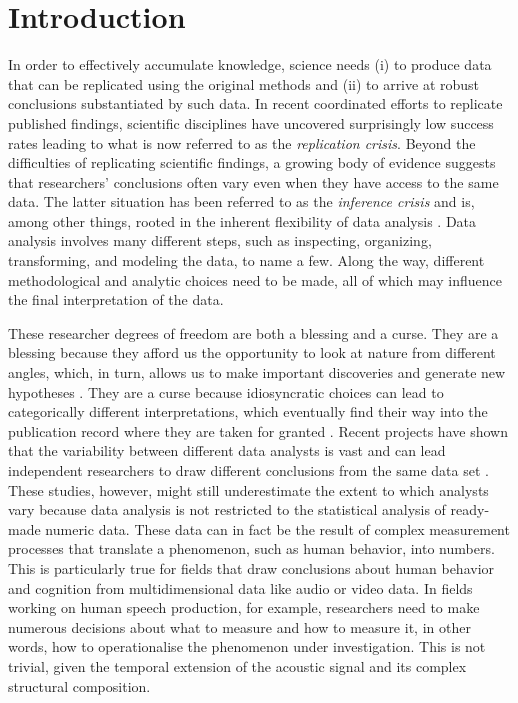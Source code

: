 \documentclass[Review,times,sageh]{sagej}
\begin{document}
\hypertarget{introduction}{%
\section{Introduction}\label{introduction}}

In order to effectively accumulate knowledge, science needs (i) to produce data that can be replicated using the original methods and (ii) to arrive at robust conclusions substantiated by such data.
In recent coordinated efforts to replicate published findings, scientific disciplines have uncovered surprisingly low success rates \citep[e.g.,][]{open2015estimating, camerer2018evaluating} leading to what is now referred to as the \emph{replication crisis}.
Beyond the difficulties of replicating scientific findings, a growing body of evidence suggests that researchers' conclusions often vary even when they have access to the same data.
The latter situation has been referred to as the \emph{inference crisis} \citep{rotello2015more, starns2019assessing} and is, among other things, rooted in the inherent flexibility of data analysis \citep[often referred to as researcher degrees of freedom:][]{simmons2011false, gelman2014statistical}.
Data analysis involves many different steps, such as inspecting, organizing, transforming, and modeling the data, to name a few.
Along the way, different methodological and analytic choices need to be made, all of which may influence the final interpretation of the data.

These researcher degrees of freedom are both a blessing and a curse.
They are a blessing because they afford us the opportunity to look at nature from different angles, which, in turn, allows us to make important discoveries and generate new hypotheses \citep[e.g.,][]{box1976science, tukey1977exploratory, de2014thought}.
They are a curse because idiosyncratic choices can lead to categorically different interpretations, which eventually find their way into the publication record where they are taken for granted \citep{simmons2011false}.
Recent projects have shown that the variability between different data analysts is vast and can lead independent researchers to draw different conclusions from the same data set \citep[e.g.,][]{silberzahn2018many, starns2019assessing, botvinik-nezer2020}.
These studies, however, might still underestimate the extent to which analysts vary because data analysis is not restricted to the statistical analysis of ready-made numeric data.
These data can in fact be the result of complex measurement processes that translate a phenomenon, such as human behavior, into numbers.
This is particularly true for fields that draw conclusions about human behavior and cognition from multidimensional data like audio or video data.
In fields working on human speech production, for example, researchers need to make numerous decisions about what to measure and how to measure it, in other words, how to operationalise the phenomenon under investigation.
This is not trivial, given the temporal extension of the acoustic signal and its complex structural composition.
\end{document}
